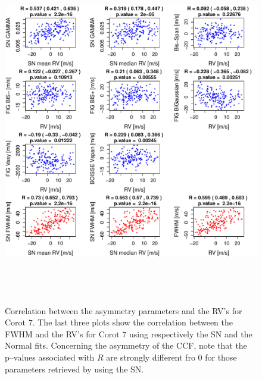 \documentclass{aa}
\begin{document}
\begin{figure}[htbp]
   \centering
\includegraphics[height = 6in]{LRa01_E_[4]Comparison_para.pdf} 
   \caption{Correlation between the asymmetry parameters and the RV's for  $\text{Corot }7$. The last three plots show the correlation between the FWHM and the RV's for  $\text{Corot }7$ using respectively the SN and the Normal fits. Concerning the asymmetry of the CCF, note that the p--values associated with $R$ are strongly different fro $0$ for those parameters retrieved by using the SN.}
   \label{fig:Corot7:corrPlot}
\end{figure}
\end{document}
